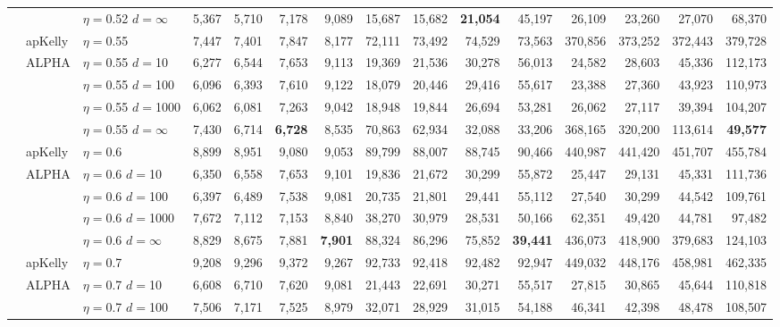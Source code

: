 \documentclass[12pt,runningheads]{llncs}
\begin{document}
{\begin{table}
\begin{tabular}{lll|rrrr|rrrr|rrrr}
 &  & $\eta=$0.52 $d=\infty$ & 5,367  & 5,710  & 7,178  & 9,089  & 15,687  & 15,682  & \bf{21,054}  & 45,197  & 26,109  & 23,260  & 27,070  & 68,370  \\
\cline{2-15} & apKelly & $\eta=$0.55 & 7,447  & 7,401  & 7,847  & 8,177  & 72,111  & 73,492  & 74,529  & 73,563  & 370,856  & 373,252  & 372,443  & 379,728  \\
\cline{2-15}
& ALPHA & $\eta=$0.55 $d=$10 & 6,277  & 6,544  & 7,653  & 9,113  & 19,369  & 21,536  & 30,278  & 56,013  & 24,582  & 28,603  & 45,336  & 112,173  \\
&  & $\eta=$0.55 $d=$100 & 6,096  & 6,393  & 7,610  & 9,122  & 18,079  & 20,446  & 29,416  & 55,617  & 23,388  & 27,360  & 43,923  & 110,973  \\
&  & $\eta=$0.55 $d=$1000 & 6,062  & 6,081  & 7,263  & 9,042  & 18,948  & 19,844  & 26,694  & 53,281  & 26,062  & 27,117  & 39,394  & 104,207  \\
 &  & $\eta=$0.55 $d=\infty$ & 7,430  & 6,714  & \bf{6,728}  & 8,535   & 70,863  & 62,934  & 32,088  & 33,206  & 368,165  & 320,200  & 113,614  & \bf{49,577}  \\
\cline{2-15} & apKelly & $\eta=$0.6 & 8,899  & 8,951  & 9,080  & 9,053  & 89,799  & 88,007  & 88,745  & 90,466  & 440,987  & 441,420  & 451,707  & 455,784  \\
\cline{2-15}
& ALPHA & $\eta=$0.6 $d=$10 & 6,350  & 6,558  & 7,653  & 9,101  & 19,836  & 21,672  & 30,299  & 55,872  & 25,447  & 29,131  & 45,331  & 111,736  \\
&  & $\eta=$0.6 $d=$100 & 6,397  & 6,489  & 7,538  & 9,081  & 20,735  & 21,801  & 29,441  & 55,112  & 27,540  & 30,299  & 44,542  & 109,761  \\
&  & $\eta=$0.6 $d=$1000 & 7,672  & 7,112  & 7,153  & 8,840  & 38,270  & 30,979  & 28,531  & 50,166  & 62,351  & 49,420  & 44,781  & 97,482  \\
 &  & $\eta=$0.6 $d=\infty$ & 8,829  & 8,675  & 7,881  & \bf{7,901}  & 88,324  & 86,296  & 75,852  & \bf{39,441}  & 436,073  & 418,900  & 379,683  & 124,103  \\
\cline{2-15} & apKelly & $\eta=$0.7 & 9,208  & 9,296  & 9,372  & 9,267  & 92,733  & 92,418  & 92,482  & 92,947  & 449,032  & 448,176  & 458,981  & 462,335  \\
\cline{2-15}
& ALPHA & $\eta=$0.7 $d=$10 & 6,608  & 6,710  & 7,620  & 9,081  & 21,443  & 22,691  & 30,271  & 55,517  & 27,815  & 30,865  & 45,644  & 110,818  \\
&  & $\eta=$0.7 $d=$100 & 7,506  & 7,171  & 7,525  & 8,979  & 32,071  & 28,929  & 31,015  & 54,188  & 46,341  & 42,398  & 48,478  & 108,507  \\

\end{tabular}
\end{table}}
\end{document}

